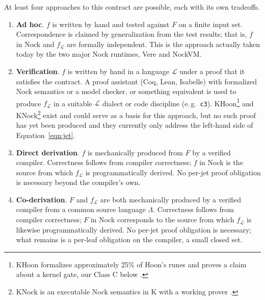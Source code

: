 \documentclass[twoside]{article}
\begin{document}
At least four approaches to this contract are possible, each with its own tradeoffs.
\begin{enumerate}
  \item  \textbf{Ad hoc}.  $f$ is written by hand and tested against $F$ on a finite input set.  Correspondence is claimed by generalization from the test results; that is, $f$ in Nock and $f_\mathcal{L}$ are formally independent.  This is the approach actually taken today by the two major Nock runtimes, Vere and NockVM.
  \item  \textbf{Verification}.  $f$ is written by hand in a language $\mathcal{L}$ under a proof that it satisfies the contract.  A proof assistant (Coq, Lean, Isabelle) with formalized Nock semantics or a model checker, or something equivalent is used to produce $f_\mathcal{L}$ in a suitable $\mathcal{L}$ dialect or code discipline (e.\,g.\ \lstinline[style=inlinecode]{c3}).  KHoon\footnote{KHoon formalizes approximately 25\% of Hoon's runes and proves a claim about a kernel gate, our Class C below \citep{Ahl2023}.} and KNock\footnote{KNock is an executable Nock semantics in K with a working prover \citep{Hjort2023}.} exist and could serve as a basis for this approach, but no such proof has yet been produced and they currently only address the left-hand side of Equation~\ref{eqn:jet}.
  \item  \textbf{Direct derivation}.  $f$ is mechanically produced from $F$ by a verified compiler.  Correctness follows from compiler correctness; $f$ in Nock is the source from which $f_\mathcal{L}$ is programmatically derived.  No per-jet proof obligation is necessary beyond the compiler's own.
  \item  \textbf{Co-derivation}.  $F$ and $f_\mathcal{L}$ are both mechanically produced by a verified compiler from a common source language $\Lambda$.  Correctness follows from compiler correctness; $F$ in Nock corresponds to the source from which $f_\mathcal{L}$ is likewise programmatically derived.  No per-jet proof obligation is necessary; what remains is a per-leaf obligation on the compiler, a small closed set.
\end{enumerate}
\end{document}

